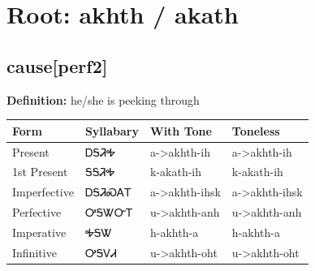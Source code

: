 \documentclass{article}%
\begin{document}
%
\normalsize%
\section*{Root: akhth / akath}%
\subsection*{cause[perf2]}%
\textbf{Definition: }%
he/she is peeking through%
\\[0.5em]%
\begin{tabular}{|l|l|l|l|}%
\hline%
\textbf{Form}&\textbf{Syllabary}&\textbf{With Tone}&\textbf{Toneless}\\%
\hline%
Present&ᎠᎦᏘᎭ&a{-}>akhth{-}ih&a{-}>akhth{-}ih\\%
1st Present&ᎦᎦᏘᎭ&k{-}akath{-}ih&k{-}akath{-}ih\\%
Imperfective&ᎠᎦᏘᏍᎪᎢ&a{-}>akhth{-}ihsk&a{-}>akhth{-}ihsk\\%
Perfective&ᎤᎦᏔᏅᎢ&u{-}>akhth{-}anh&u{-}>akhth{-}anh\\%
Imperative&ᎭᎦᏔ&h{-}akhth{-}a&h{-}akhth{-}a\\%
Infinitive&ᎤᎦᏙᏗ&u{-}>akhth{-}oht&u{-}>akhth{-}oht\\%
\hline%
\end{tabular}%
\\[1em]%
\end{document}
